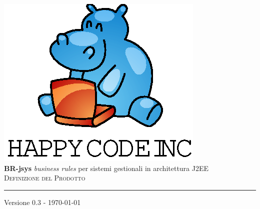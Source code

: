 \documentclass[11pt,titlepage,a4paper]{report}
\begin{document}
\newcommand{\lv}{ 0.3 } %
\newcommand{\dt}{ Definizione del Prodotto }%
\newcommand{\Glossario}{ Glossario.1.4.pdf }
\newcommand{\br}{business rule }
\newcommand{\brs}{business rules }
\newcommand{\bo}{business object }
\newcommand{\bos}{business objects }
\newcommand{\re}{repository}
\newcommand{\brp}{BusinessRuleParser }
\newcommand{\brl}{BusinessRuleLexer }
\newcommand{\BR}{BusinessRule }


\begin{titlepage}\begin{center}
\vspace*{0.5in}
\includegraphics{logo.eps}
\vspace*{0.2in} \\
{\Large \textbf{BR-jsys}}
{\Large \emph{business rules} per sistemi gestionali in architettura J2EE } 
\vspace{2in} \\
\Huge \textsc{ \dt }
\par\rule{10cm}{0.4pt} \par {\large Versione \lv - \today} \\
\end{center}\end{titlepage}
\vspace*{0.5in}
\end{document}
